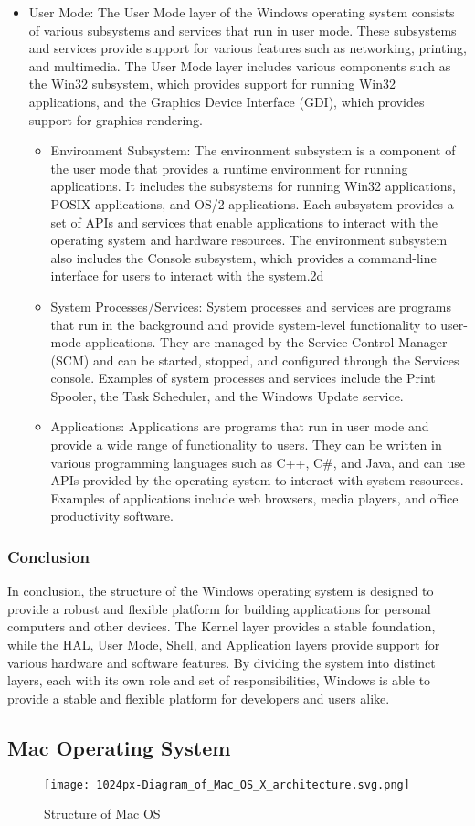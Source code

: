 \documentclass[conference]{IEEEtran}
\begin{document}
\begin{itemize}
     \item User Mode: The User Mode layer of the Windows operating system consists of various subsystems and services that run in user mode. These subsystems and services provide support for various features such as networking, printing, and multimedia. The User Mode layer includes various components such as the Win32 subsystem, which provides support for running Win32 applications, and the Graphics Device Interface (GDI), which provides support for graphics rendering.

     \begin{itemize}
         \item Environment Subsystem: The environment subsystem is a component of the user mode that provides a runtime environment for running applications. It includes the subsystems for running Win32 applications, POSIX applications, and OS/2 applications. Each subsystem provides a set of APIs and services that enable applications to interact with the operating system and hardware resources. The environment subsystem also includes the Console subsystem, which provides a command-line interface for users to interact with the system.2d
         \linebreak
         \item System Processes/Services: System processes and services are programs that run in the background and provide system-level functionality to user-mode applications. They are managed by the Service Control Manager (SCM) and can be started, stopped, and configured through the Services console. Examples of system processes and services include the Print Spooler, the Task Scheduler, and the Windows Update service.
         \linebreak
         \item Applications: Applications are programs that run in user mode and provide a wide range of functionality to users. They can be written in various programming languages such as C++, C\#, and Java, and can use APIs provided by the operating system to interact with system resources. Examples of applications include web browsers, media players, and office productivity software.
     \end{itemize}
\end{itemize}

\subsubsection*{Conclusion}
In conclusion, the structure of the Windows operating system is designed to provide a robust and flexible platform for building applications for personal computers and other devices. The Kernel layer provides a stable foundation, while the HAL, User Mode, Shell, and Application layers provide support for various hardware and software features. By dividing the system into distinct layers, each with its own role and set of responsibilities, Windows is able to provide a stable and flexible platform for developers and users alike.

\subsection{Mac Operating System}

\begin{figure}[htbp]
\centerline{\texttt{[image: 1024px-Diagram\_of\_Mac\_OS\_X\_architecture.svg.png]}}
\caption{Structure of Mac OS}
\label{fig4}
\end{figure}
\end{document}
